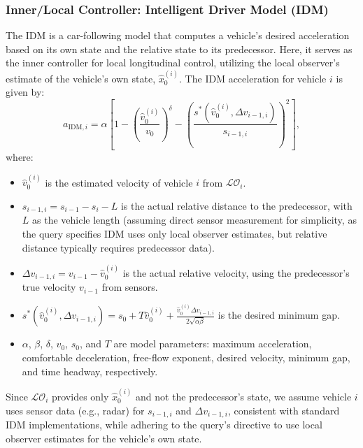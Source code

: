 \documentclass[letterpaper, 10pt, conference]{ieeeconf}  %
\def\LO{\mathcal{LO}} %
\begin{document}
\subsubsection{Inner/Local Controller: Intelligent Driver Model (IDM)}
The IDM is a car-following model that computes a vehicle's desired acceleration based on its own state and the relative state to its predecessor. Here, it serves as the inner controller for local longitudinal control, utilizing the local observer's estimate of the vehicle's own state, $\hat{x}_0^{(i)}$. The IDM acceleration for vehicle $i$ is given by:
\begin{equation}
    a_{\text{IDM},i} = \alpha \left[ 1 - \left( \frac{\hat{v}_0^{(i)}}{v_0} \right)^\delta - \left( \frac{s^*(\hat{v}_0^{(i)}, \Delta v_{i-1,i})}{s_{i-1,i}} \right)^2 \right],
\end{equation}
where:
\begin{itemize}
    \item $\hat{v}_0^{(i)}$ is the estimated velocity of vehicle $i$ from $\LO_i$.
    \item $s_{i-1,i} = s_{i-1} - s_i - L$ is the actual relative distance to the predecessor, with $L$ as the vehicle length (assuming direct sensor measurement for simplicity, as the query specifies IDM uses only local observer estimates, but relative distance typically requires predecessor data).
    \item $\Delta v_{i-1,i} = v_{i-1} - \hat{v}_0^{(i)}$ is the actual relative velocity, using the predecessor's true velocity $v_{i-1}$ from sensors.
    \item $s^*(\hat{v}_0^{(i)}, \Delta v_{i-1,i}) = s_0 + T \hat{v}_0^{(i)} + \frac{\hat{v}_0^{(i)} \Delta v_{i-1,i}}{2 \sqrt{\alpha \beta}}$ is the desired minimum gap.
    \item $\alpha$, $\beta$, $\delta$, $v_0$, $s_0$, and $T$ are model parameters: maximum acceleration, comfortable deceleration, free-flow exponent, desired velocity, minimum gap, and time headway, respectively.
\end{itemize}
Since $\LO_i$ provides only $\hat{x}_0^{(i)}$ and not the predecessor's state, we assume vehicle $i$ uses sensor data (e.g., radar) for $s_{i-1,i}$ and $\Delta v_{i-1,i}$, consistent with standard IDM implementations, while adhering to the query's directive to use local observer estimates for the vehicle's own state.

\end{document}
